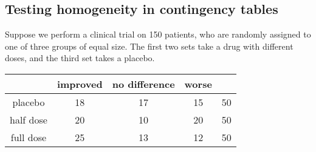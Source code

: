 \subsection{Testing homogeneity in contingency tables}
\begin{example}
	Suppose we perform a clinical trial on 150 patients, who are randomly assigned to one of three groups of equal size.
	The first two sets take a drug with different doses, and the third set takes a placebo.

	\begin{center}
		\begin{tabular}{c | c c c | c}
			& improved & no difference & worse & \\\hline
			placebo & 18 & 17 & 15 & 50 \\
			half dose & 20 & 10 & 20 & 50 \\
			full dose & 25 & 13 & 12 & 50
		\end{tabular}
	\end{center}


\end{example}
